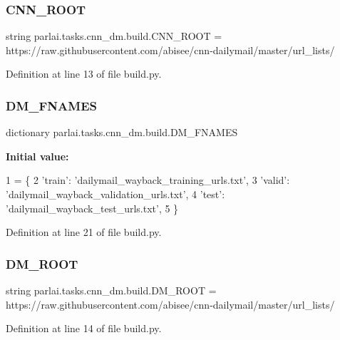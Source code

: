 \subsubsection{\texorpdfstring{C\+N\+N\+\_\+\+R\+O\+OT}{CNN\_ROOT}}
{\footnotesize\ttfamily string parlai.\+tasks.\+cnn\+\_\+dm.\+build.\+C\+N\+N\+\_\+\+R\+O\+OT = \textquotesingle{}https\+://raw.\+githubusercontent.\+com/abisee/cnn-\/dailymail/master/url\+\_\+lists/\textquotesingle{}}



Definition at line 13 of file build.\+py.

\mbox{\label{namespaceparlai_1_1tasks_1_1cnn__dm_1_1build_a8d9dcf86181a23e28f504f7b30f59263}} 
\subsubsection{\texorpdfstring{D\+M\+\_\+\+F\+N\+A\+M\+ES}{DM\_FNAMES}}
{\footnotesize\ttfamily dictionary parlai.\+tasks.\+cnn\+\_\+dm.\+build.\+D\+M\+\_\+\+F\+N\+A\+M\+ES}

{\bfseries Initial value\+:}
\begin{DoxyCode}
1 =  \{
2     \textcolor{stringliteral}{'train'}: \textcolor{stringliteral}{'dailymail\_wayback\_training\_urls.txt'},
3     \textcolor{stringliteral}{'valid'}: \textcolor{stringliteral}{'dailymail\_wayback\_validation\_urls.txt'},
4     \textcolor{stringliteral}{'test'}: \textcolor{stringliteral}{'dailymail\_wayback\_test\_urls.txt'},
5 \}
\end{DoxyCode}


Definition at line 21 of file build.\+py.

\mbox{\label{namespaceparlai_1_1tasks_1_1cnn__dm_1_1build_a9799a43e748085759f008d043eaa7d69}} 
\subsubsection{\texorpdfstring{D\+M\+\_\+\+R\+O\+OT}{DM\_ROOT}}
{\footnotesize\ttfamily string parlai.\+tasks.\+cnn\+\_\+dm.\+build.\+D\+M\+\_\+\+R\+O\+OT = \textquotesingle{}https\+://raw.\+githubusercontent.\+com/abisee/cnn-\/dailymail/master/url\+\_\+lists/\textquotesingle{}}



Definition at line 14 of file build.\+py.

